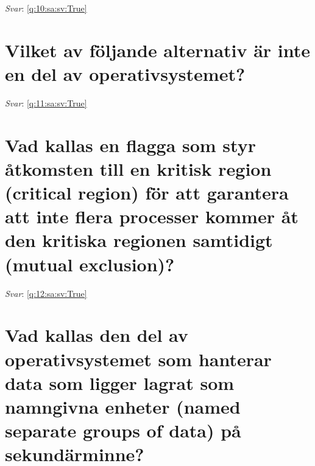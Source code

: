 \documentclass[a4paper,11pt,oneside]{book}
\begin{document}
\begin{sloppypar}
\label{q:10:sa:sv:False}

\vspace{2cm}

\noindent\makebox[\textwidth]{\hrulefill}

\vspace{1cm}

\textit{Svar}: \autoref{q:10:sa:sv:True}



\section{Vilket av f\"oljande alternativ \"ar inte en del av operativsystemet?}

\label{q:11:sa:sv:False}

\vspace{2cm}

\noindent\makebox[\textwidth]{\hrulefill}

\vspace{1cm}

\textit{Svar}: \autoref{q:11:sa:sv:True}



\section{Vad kallas en flagga som styr \r{a}tkomsten till en kritisk region (critical region) f\"or att garantera att inte flera processer kommer \r{a}t den kritiska regionen samtidigt (mutual exclusion)?}

\label{q:12:sa:sv:False}

\vspace{2cm}

\noindent\makebox[\textwidth]{\hrulefill}

\vspace{1cm}

\textit{Svar}: \autoref{q:12:sa:sv:True}



\section{Vad kallas den del av operativsystemet som hanterar data som ligger lagrat som namngivna enheter (named separate groups of data) p\r{a} sekund\"arminne?}

\label{q:13:sa:sv:False}

\vspace{2cm}

\noindent\makebox[\textwidth]{\hrulefill}


\end{sloppypar}
\end{document}
